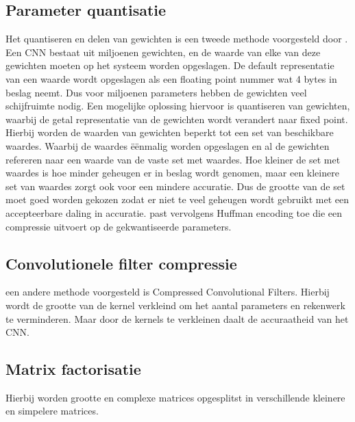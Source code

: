 \subsection{Parameter quantisatie}
Het quantiseren en delen van gewichten is een tweede methode voorgesteld door \cite{han_deep_2016}.
Een CNN bestaat uit miljoenen gewichten, en de waarde van elke van deze gewichten moeten op het systeem worden opgeslagen.
De default representatie van een waarde wordt opgeslagen als een floating point nummer wat 4 bytes in beslag neemt.
Dus voor miljoenen parameters hebben de gewichten veel schijfruimte nodig.
Een mogelijke oplossing hiervoor is quantiseren van gewichten, waarbij de getal representatie van de gewichten wordt verandert naar fixed point.
Hierbij worden de waarden van gewichten beperkt tot een set van beschikbare waardes.
Waarbij de waardes \"e\"enmalig worden opgeslagen en al de gewichten refereren naar een waarde van de vaste set met waardes.
Hoe kleiner de set met waardes is hoe minder geheugen er in beslag wordt genomen, maar een kleinere set van waardes zorgt ook voor een mindere accuratie.
Dus de grootte van de set moet goed worden gekozen zodat er niet te veel geheugen wordt gebruikt met een accepteerbare daling in accuratie.
\cite{han_deep_2016} past vervolgens Huffman encoding toe die een compressie uitvoert op de gekwantiseerde parameters.

\subsection{Convolutionele filter compressie}
een andere methode voorgesteld is Compressed Convolutional Filters.
Hierbij wordt de grootte van de kernel verkleind om het aantal parameters en rekenwerk te verminderen.
Maar door de kernels te verkleinen daalt de accuraatheid van het CNN.

\subsection{Matrix factorisatie}
Hierbij worden grootte en complexe matrices opgesplitst in verschillende kleinere en simpelere matrices.


